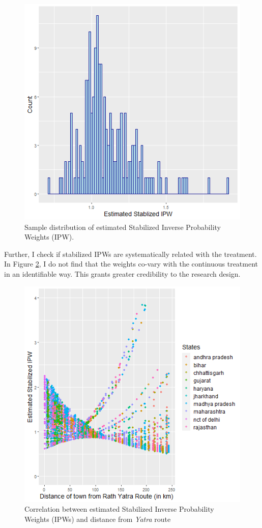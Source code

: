 \documentclass{article}
\begin{document}
\begin{figure}[H]
    \centering
    \includegraphics[scale = 0.6]{images/graph_ipw_dist.png}
    \caption{Sample distribution of estimated Stabilized Inverse Probability Weights (IPW).}
    \label{fig:ipw_s}
\end{figure}

Further, I check if stabilized IPWs are systematically related with the treatment. In Figure \ref{fig:ipw_yatra}, I do not find that the weights co-vary with the continuous treatment in an identifiable way. This grants greater credibility to the research design.

\begin{figure}[H]
    \centering
    \includegraphics[scale = 0.6]{images/graph_ipw_yatra.png}
    \caption{Correlation between estimated Stabilized Inverse Probability Weights (IPWs) and distance from \textit{Yatra} route}
    \label{fig:ipw_yatra}
\end{figure}
\end{document}
